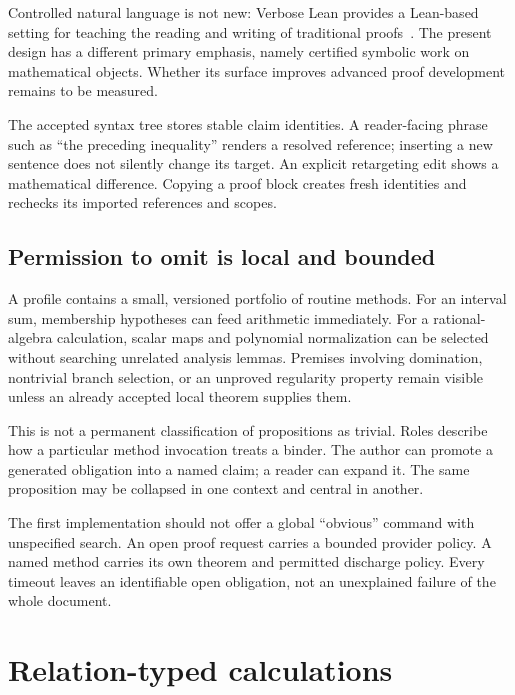 \documentclass[11pt,a4paper]{article}
\theoremstyle{remark}\newtheorem{example}[proposition]{Example}
\begin{document}
Controlled natural language is not new: Verbose Lean provides a Lean-based setting for teaching the reading and writing of traditional proofs~\cite{verbose}. The present design has a different primary emphasis, namely certified symbolic work on mathematical objects. Whether its surface improves advanced proof development remains to be measured.

The accepted syntax tree stores stable claim identities. A reader-facing phrase such as ``the preceding inequality'' renders a resolved reference; inserting a new sentence does not silently change its target. An explicit retargeting edit shows a mathematical difference. Copying a proof block creates fresh identities and rechecks its imported references and scopes.

\subsection{Permission to omit is local and bounded}
A profile contains a small, versioned portfolio of routine methods. For an interval sum, membership hypotheses can feed arithmetic immediately. For a rational-algebra calculation, scalar maps and polynomial normalization can be selected without searching unrelated analysis lemmas. Premises involving domination, nontrivial branch selection, or an unproved regularity property remain visible unless an already accepted local theorem supplies them.

This is not a permanent classification of propositions as trivial. Roles describe how a particular method invocation treats a binder. The author can promote a generated obligation into a named claim; a reader can expand it. The same proposition may be collapsed in one context and central in another.

The first implementation should not offer a global ``obvious'' command with unspecified search. An open proof request carries a bounded provider policy. A named method carries its own theorem and permitted discharge policy. Every timeout leaves an identifiable open obligation, not an unexplained failure of the whole document.

\section{Relation-typed calculations}\label{sec:relations}
\end{document}
